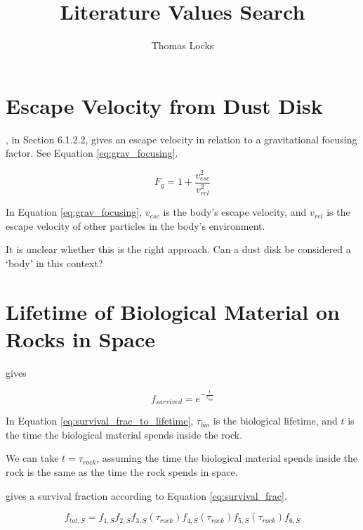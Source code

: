 \documentclass{article}
\title{Literature Values Search}
\author{Thomas Locks}
\begin{document}
\noindent
\maketitle

\section{Escape Velocity from Dust Disk}
\citet{holland2014treatise}, in Section 6.1.2.2, gives an escape velocity in relation to a gravitational focusing factor. See Equation \ref{eq:grav_focusing}.

\begin{equation}
    F_g = 1 + \frac{v_{esc}^2}{v_{rel}^2}
    \label{eq:grav_focusing}
\end{equation}

In Equation \ref{eq:grav_focusing}, $v_{esc}$ is the body's escape velocity, and $v_{rel}$ is the escape velocity of other particles in the body's environment.

It is unclear whether this is the right approach. Can a dust disk be considered a `body' in this context?

\section{Lifetime of Biological Material on Rocks in Space}
\citet{ginsburg2018galactic} gives


\begin{equation}
    f_{survived} = e^{-\frac{t}{\tau_{bio}}}
    \label{eq:survival_frac_to_lifetime}
\end{equation}

In Equation \ref{eq:survival_frac_to_lifetime}, $\tau_{bio}$ is the biological lifetime, and $t$ is the time the biological material spends inside the rock.


We can take $t = \tau_{rock}$, assuming the time the biological material spends inside the rock is the same as the time the rock spends in space.


\citet{mileikowsky2000risks} gives a survival fraction according to Equation \ref{eq:survival_frac}.

\begin{equation}
    f_{tot,S} = f_{1,S} f_{2,S} f_{3,S}(\tau_{rock}) f_{4,S}(\tau_{rock}) f_{5,S}(\tau_{rock}) f_{6,S}
    \label{eq:survival_frac}
\end{equation}
\end{document}
